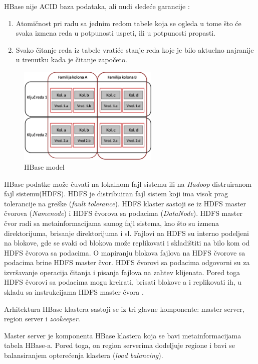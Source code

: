 \documentclass[12pt,oneside]{memoir}
\begin{document}
HBase nije ACID baza podataka, ali nudi sledeće garancije \cite{hbaseACID}: 

\begin{enumerate}
\item[\textbullet] Atomičnost pri radu sa jednim redom tabele koja se ogleda u tome što će svaka izmena reda u potpunosti uspeti, ili u potpunosti propasti.
\item[\textbullet] Svako čitanje reda iz tabele vratiće stanje reda koje je bilo aktuelno najranije u trenutku kada je čitanje započeto. 
\end{enumerate}

\begin{figure}[!ht]
  \centering
  \includegraphics[width=0.6\textwidth]{colFamily.png}
  \caption{HBase model}
  \label{fig:grafikon}
\end{figure}

HBase podatke može čuvati na lokalnom fajl sistemu ili na \textit{Hadoop} distruiranom fajl sistemu(HDFS). HDFS je distribuiran fajl sistem koji ima visok prag tolerancije na greške (\textit{fault tolerance}). HDFS klaster sastoji se iz HDFS master čvorova (\textit{Namenode}) i HDFS čvorova sa podacima (\textit{DataNode}). HDFS master čvor radi sa metainformacijama samog fajl sistema, kao što su izmena direktorijuma, brisanje direktorijuma i sl. Fajlovi na HDFS su interno podeljeni na blokove, gde se svaki od blokova može replikovati i skladištiti na bilo kom od HDFS čvorova sa podacima. O mapiranju blokova fajlova na HDFS čvorove sa podacima brine HDFS master čvor. HDFS čvorovi sa podacima odgovorni su za izvršavanje operacija čitanja i pisanja fajlova na zahtev klijenata. Pored toga HDFS čvorovi sa podacima mogu kreirati, brisati blokove a i replikovati ih, u skladu sa instrukcijama HDFS master čvora \cite{hdfs}.

Arhitektura HBase klastera sastoji se iz tri glavne komponente: master server, region server i \textit{zookeeper}.

Master server  je komponenta HBase klastera koja se bavi metainformacijama tabela HBase-a. Pored toga, on region serverima dodeljuje regione i bavi se balansiranjem opterećenja klastera (\textit{load balancing}).
\end{document}
